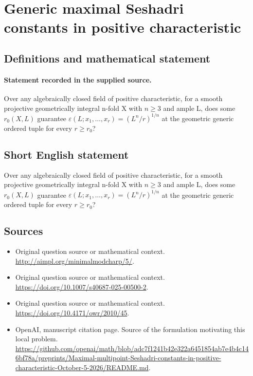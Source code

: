 \documentclass[11pt]{article}
\begin{document}
\section*{Generic maximal Seshadri constants in positive characteristic}\label{statement}
\subsection{Definitions and mathematical statement}
\paragraph{Statement recorded in the supplied source.}
Over any algebraically closed field of positive characteristic, for a smooth projective geometrically integral n-fold X with $n\geq 3$ and ample L, does some $r_{0}(X,L)$ guarantee $\varepsilon (L;x_{1},\dots ,x_r)=(L^n/r)^{1/n}$ at the geometric generic ordered tuple for every $r\geq r_{0}$?
\subsection{Short English statement}
Over any algebraically closed field of positive characteristic, for a smooth projective geometrically integral n-fold X with $n\geq 3$ and ample L, does some $r_{0}(X,L)$ guarantee $\varepsilon (L;x_{1},\dots ,x_r)=(L^n/r)^{1/n}$ at the geometric generic ordered tuple for every $r\geq r_{0}$?
\subsection{Sources}
\begin{itemize}
\item[S1] Original question source or mathematical context.
\url{http://aimpl.org/minimalmodcharp/5/}.
\item[S2] Original question source or mathematical context.
\url{https://doi.org/10.1007/s40687-025-00500-2}.
\item[S3] Original question source or mathematical context.
\url{https://doi.org/10.4171/owr/2010/45}.
\item[S4] OpenAI, manuscript citation page. Source of the formulation motivating this local problem.
\url{https://github.com/openai/math/blob/adc7f1241b42e322a6451854ab7e4b4c146bf78a/preprints/Maximal-multipoint-Seshadri-constants-in-positive-characteristic-October-5-2026/README.md}.
\end{itemize}
\end{document}
